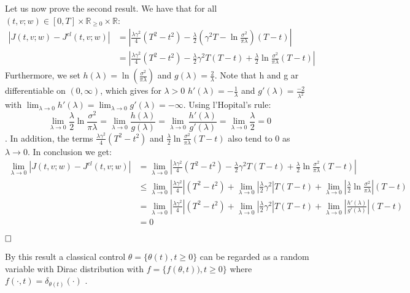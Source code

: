 \documentclass[oneside, a4paper, onecolumn, 11pt]{article}
\begin{document}
Let us now prove the second result. We have that for all $(t,v;w)\in [0,T]\times \mathbb{R}_{\geq 0} \times \mathbb{R}$: 
\begin{align*}
    \left| J(t,v;w) - J^{cl}(t,v;w) \right| &= \left| \frac{\lambda\gamma^2}{4}(T^2-t^2) -\frac{\lambda}{2}(\gamma^2T-\ln{\frac{\sigma^2}{\pi\lambda}})(T-t)\right| \\ 
    &= \left| \frac{\lambda\gamma^2}{4}(T^2-t^2) - \frac{\lambda}{2}\gamma^2T(T-t) + \frac{\lambda}{2}\ln\frac{\sigma^2}{\pi\lambda}(T-t) \right|
\end{align*}
Furthermore, we set $h(\lambda) = \ln\left(\frac{\sigma^2}{\pi\lambda}\right)$  and $g(\lambda) = \frac{2}{\lambda}$. Note that h and g ar differentiable on $(0, \infty)$, which gives for $\lambda>0$ $h'(\lambda) = -\frac{1}{\lambda}$  and $g'(\lambda) = \frac{-2}{\lambda^2}$ with $\lim_{\lambda\to 0} h'(\lambda) = \lim_{\lambda \to 0} g'(\lambda) = -\infty$.
Using l'Hopital's rule: $$\lim_{\lambda \to 0}\frac{\lambda}{2}\ln{\frac{\sigma^2}{\pi\lambda}} = \lim_{\lambda \to 0} \frac{h(\lambda)}{g(\lambda)} = \lim_{\lambda \to 0 } \frac{h'(\lambda)}{g'(\lambda)} = \lim_{\lambda \to 0} \frac{\lambda}{2} = 0 $$. In addition, the terms $\frac{\lambda\gamma^2}{4}(T^2-t^2)$ and $\frac{\lambda}{2}\ln\frac{\sigma^2}{\pi\lambda}(T-t)$ also tend to 0 as $\lambda \to 0$. 
In conclusion we get: 
\begin{align*}  
    \lim_{\lambda \to 0} \left| J(t,v;w) - J^{cl}(t,v;w) \right| 
    &=  \lim_{\lambda \to 0}  \left| \frac{\lambda\gamma^2}{4}(T^2-t^2) - \frac{\lambda}{2}\gamma^2T(T-t) + \frac{\lambda}{2}\ln\frac{\sigma^2}{\pi\lambda}(T-t) \right| \\
    &\leq \lim_{\lambda \to 0}  \left| \frac{\lambda\gamma^2}{4} \right|(T^2-t^2) + \lim_{\lambda \to 0} \left|\frac{\lambda}{2}\gamma^2\right|T(T-t)  + \lim_{\lambda \to 0}\left|\frac{\lambda}{2}\ln\frac{\sigma^2}{\pi\lambda}\right|(T-t) \\
    &= \lim_{\lambda \to 0}  \left| \frac{\lambda\gamma^2}{4} \right|(T^2-t^2) + \lim_{\lambda \to 0} \left|\frac{\lambda}{2}\gamma^2\right|T(T-t)  + \lim_{\lambda \to 0}\left|\frac{h'(\lambda)}{g'(\lambda)}\right|(T-t) \\
    &= 0 
\end{align*}

$\hfill \square$

By this result a classical control $\theta = \{\theta(t), t\geq 0 \} $ can be regarded as a random variable with Dirac distribution with $f=\{f(\theta,t)), t\geq 0\}$ where $f(\cdot, t) = \delta_{\theta(t)}(\cdot)$  \cite{WangZariZhou2020}. 
\end{document}
